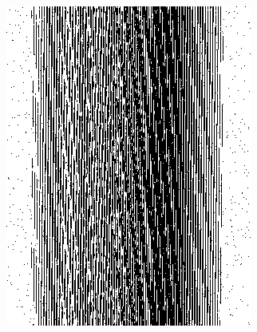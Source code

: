 \documentclass[]{article}
\begin{document}
\begin{section}
\begin{subsection}
\begin{figure}
\begin{subfigure}{0.4\textwidth}
                \includegraphics[width=\textwidth]{uncoded.png}
                \caption{}
                \label{fig:uncoded}
            \end{subfigure}


\end{figure}
\end{subsection}
\end{section}
\end{document}
